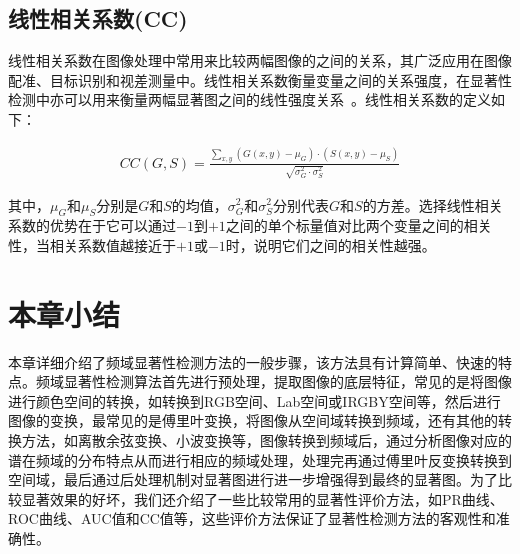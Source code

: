 \subsection{线性相关系数(CC)}
\label{2_5_4}

线性相关系数在图像处理中常用来比较两幅图像的之间的关系，其广泛应用在图像配准、目标识别和视差测量中。线性相关系数衡量变量之间的关系强度，在显著性检测中亦可以用来衡量两幅显著图之间的线性强度关系~\cite{Jost2005Assessing}。线性相关系数的定义如下：
\begin{linenomath}
\begin{align}
CC(G,S)=\frac{\sum_{x,y}(G(x,y)-\mu_{G})\cdot(S(x,y)-\mu_{S})}{\sqrt{\sigma_{G}^{2}\cdot\sigma_{S}^{2}}}
\label{式2_43}
\end{align}
\end{linenomath}
其中，$\mu_{G}$和$\mu_{S}$分别是$G$和$S$的均值，$\sigma_{G}^{2}$和$\sigma_{S}^{2}$分别代表$G$和$S$的方差。选择线性相关系数的优势在于它可以通过$-1$到$+1$之间的单个标量值对比两个变量之间的相关性，当相关系数值越接近于$+1$或$-1$时，说明它们之间的相关性越强。

\section{本章小结}
\label{2_5_5}

本章详细介绍了频域显著性检测方法的一般步骤，该方法具有计算简单、快速的特点。频域显著性检测算法首先进行预处理，提取图像的底层特征，常见的是将图像进行颜色空间的转换，如转换到RGB空间、Lab空间或IRGBY空间等，然后进行图像的变换，最常见的是傅里叶变换，将图像从空间域转换到频域，还有其他的转换方法，如离散余弦变换、小波变换等，图像转换到频域后，通过分析图像对应的谱在频域的分布特点从而进行相应的频域处理，处理完再通过傅里叶反变换转换到空间域，最后通过后处理机制对显著图进行进一步增强得到最终的显著图。为了比较显著效果的好坏，我们还介绍了一些比较常用的显著性评价方法，如PR曲线、ROC曲线、AUC值和CC值等，这些评价方法保证了显著性检测方法的客观性和准确性。

